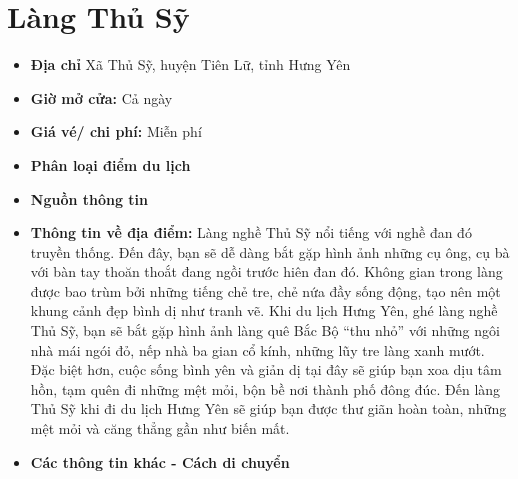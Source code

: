 \documentclass{article}
\begin{document}
\section{Làng Thủ Sỹ}
\begin{itemize}
    \item{\textbf{Địa chỉ}} Xã Thủ Sỹ, huyện Tiên Lữ, tỉnh Hưng Yên

    \item{\textbf{Giờ mở cửa:}} Cả ngày

    \item{\textbf{Giá vé/ chi phí:}} Miễn phí

    \item{\textbf{Phân loại điểm du lịch}} 

    \item{\textbf{Nguồn thông tin}} 

    \item{\textbf{Thông tin về địa điểm:}} Làng nghề Thủ Sỹ nổi tiếng với nghề đan đó truyền thống. Đến đây, bạn sẽ dễ dàng bắt gặp hình ảnh những cụ ông, cụ bà với bàn tay thoăn thoắt đang ngồi trước hiên đan đó. Không gian trong làng được bao trùm bởi những tiếng chẻ tre, chẻ nứa đầy sống động, tạo nên một khung cảnh đẹp bình dị như tranh vẽ. Khi du lịch Hưng Yên, ghé làng nghề Thủ Sỹ, bạn sẽ bắt gặp hình ảnh làng quê Bắc Bộ “thu nhỏ” với những ngôi nhà mái ngói đỏ, nếp nhà ba gian cổ kính, những lũy tre làng xanh mướt. Đặc biệt hơn, cuộc sống bình yên và giản dị tại đây sẽ giúp bạn xoa dịu tâm hồn, tạm quên đi những mệt mỏi, bộn bề nơi thành phố đông đúc. Đến làng Thủ Sỹ khi đi du lịch Hưng Yên sẽ giúp bạn được thư giãn hoàn toàn, những mệt mỏi và căng thẳng gần như biến mất.
\end{itemize}

\begin{itemize}
    \item{\textbf{Các thông tin khác - Cách di chuyển}} 
\end{itemize}
\end{document}
